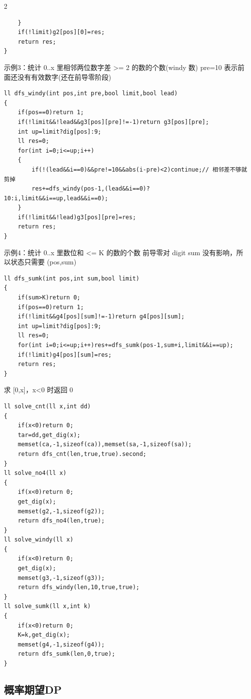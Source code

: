 \documentclass[UTF8,fontset=fandol,a4paper,twoside]{ctexart}
\newcommand{\note}[1]{{\fontsize{10}{12}\selectfont #1\par}}
\begin{document}
\begin{multicols}{2}
\begin{lstlisting}
    }
    if(!limit)g2[pos][0]=res;
    return res;
}
\end{lstlisting}
\note{示例3：统计 0.\allowbreak{}.\allowbreak{}x 里相邻两位数字差 >\allowbreak{}=\allowbreak{} 2 的数的个数(\allowbreak{}windy 数)\allowbreak{} pre=\allowbreak{}10 表示前面还没有有效数字(\allowbreak{}还在前导零阶段)\allowbreak{}}
\begin{lstlisting}
ll dfs_windy(int pos,int pre,bool limit,bool lead)
{
    if(pos==0)return 1;
    if(!limit&&!lead&&g3[pos][pre]!=-1)return g3[pos][pre];
    int up=limit?dig[pos]:9;
    ll res=0;
    for(int i=0;i<=up;i++)
    {
        if(!(lead&&i==0)&&pre!=10&&abs(i-pre)<2)continue;// 相邻差不够就剪掉
        res+=dfs_windy(pos-1,(lead&&i==0)?10:i,limit&&i==up,lead&&i==0);
    }
    if(!limit&&!lead)g3[pos][pre]=res;
    return res;
}
\end{lstlisting}
\note{示例4：统计 0.\allowbreak{}.\allowbreak{}x 里数位和 <\allowbreak{}=\allowbreak{} K 的数的个数 前导零对 digit sum 没有影响，所以状态只需要 (\allowbreak{}pos,\allowbreak{}sum)\allowbreak{}}
\begin{lstlisting}
ll dfs_sumk(int pos,int sum,bool limit)
{
    if(sum>K)return 0;
    if(pos==0)return 1;
    if(!limit&&g4[pos][sum]!=-1)return g4[pos][sum];
    int up=limit?dig[pos]:9;
    ll res=0;
    for(int i=0;i<=up;i++)res+=dfs_sumk(pos-1,sum+i,limit&&i==up);
    if(!limit)g4[pos][sum]=res;
    return res;
}
\end{lstlisting}
\note{求 [\allowbreak{}0,\allowbreak{}x]\allowbreak{}，x<\allowbreak{}0 时返回 0}
\begin{lstlisting}
ll solve_cnt(ll x,int dd)
{
    if(x<0)return 0;
    tar=dd,get_dig(x);
    memset(ca,-1,sizeof(ca)),memset(sa,-1,sizeof(sa));
    return dfs_cnt(len,true,true).second;
}
ll solve_no4(ll x)
{
    if(x<0)return 0;
    get_dig(x);
    memset(g2,-1,sizeof(g2));
    return dfs_no4(len,true);
}
ll solve_windy(ll x)
{
    if(x<0)return 0;
    get_dig(x);
    memset(g3,-1,sizeof(g3));
    return dfs_windy(len,10,true,true);
}
ll solve_sumk(ll x,int k)
{
    if(x<0)return 0;
    K=k,get_dig(x);
    memset(g4,-1,sizeof(g4));
    return dfs_sumk(len,0,true);
}
\end{lstlisting}
\subsection{概率期望DP}


\end{multicols}
\end{document}
